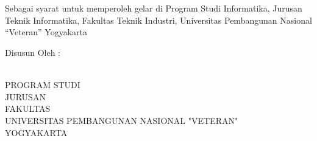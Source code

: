 % 

% 

\begin{titlepage}
  \begin{center}
    \vspace*{0cm}
     \\
    
    \vspace*{1cm}
    \ThesisType\\
    \vspace*{1cm}
    Sebagai syarat untuk memperoleh gelar \gelar di Program
    Studi Informatika, Jurusan Teknik Informatika, Fakultas Teknik
    Industri, Universitas Pembangunan Nasional “Veteran”
    Yogyakarta
    \vspace*{2cm}

    \UniversityLogo
    \vspace*{1cm}

    \normalfont\normalsize

    Disusun Oleh :\\
    \underline{\penulis}\\
    \nim
    \vspace*{1.5cm}

    PROGRAM STUDI \Prodi\\
    JURUSAN \Jurusan\\
    FAKULTAS \Fakultas\\
    UNIVERSITAS PEMBANGUNAN NASIONAL "VETERAN"\\
    YOGYAKARTA\\
    \tahun


  \end{center}
\end{titlepage}